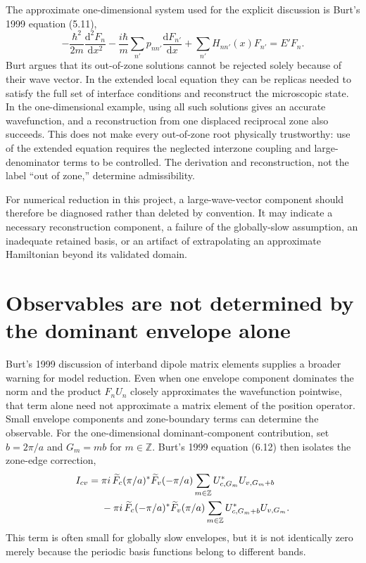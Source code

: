The approximate one-dimensional system used for the explicit discussion is
Burt's 1999 equation (5.11),
\begin{equation}
  -\frac{\hbar^2}{2m}
   \frac{\mathrm{d}^2F_n}{\mathrm{d}x^2}
  -\frac{i\hbar}{m}\sum_{n'}p_{nn'}
   \frac{\mathrm{d}F_{n'}}{\mathrm{d}x}
  +\sum_{n'}H_{nn'}(x)F_{n'}
  =E'F_n.
  \label{eq:burt-out-of-zone-system}
\end{equation}
Burt argues that its out-of-zone solutions cannot be rejected solely because
of their wave vector. In the extended local equation they can be replicas needed
to satisfy the full set of interface conditions and reconstruct the microscopic
state. In the one-dimensional example, using all such solutions gives an
accurate wavefunction, and a reconstruction from one displaced reciprocal zone
also succeeds. This does not make every out-of-zone root physically trustworthy:
use of the extended equation requires the neglected interzone coupling and
large-denominator terms to be controlled. The derivation and reconstruction,
not the label ``out of zone,'' determine admissibility.

For numerical reduction in this project, a large-wave-vector component should
therefore be diagnosed rather than deleted by convention. It may indicate a
necessary reconstruction component, a failure of the globally-slow assumption,
an inadequate retained basis, or an artifact of extrapolating an approximate
Hamiltonian beyond its validated domain.

\section{Observables are not determined by the dominant envelope alone}

Burt's 1999 discussion of interband dipole matrix elements supplies a broader
warning for model reduction. Even when one envelope component dominates the
norm and the product $F_nU_n$ closely approximates the wavefunction pointwise,
that term alone need not approximate a matrix element of the position operator.
Small envelope components and zone-boundary terms can determine the observable.
For the one-dimensional dominant-component contribution, set $b=2\pi/a$ and
$G_m=mb$ for $m\in\mathbb Z$. Burt's 1999 equation (6.12) then isolates the
zone-edge correction,
\begin{align}
  I_{cv}
  ={}&\pi i\,
  \widetilde F_c(\pi/a)^{*}\widetilde F_v(-\pi/a)
  \sum_{m\in\mathbb Z} U_{c,G_m}^{*}U_{v,G_m+b}
  \notag\\
  &-\pi i\,
  \widetilde F_c(-\pi/a)^{*}\widetilde F_v(\pi/a)
  \sum_{m\in\mathbb Z} U_{c,G_m+b}^{*}U_{v,G_m}.
  \label{eq:burt-dipole-zone-edge}
\end{align}
This term is often small for globally slow envelopes, but it is not identically
zero merely because the periodic basis functions belong to different bands.

